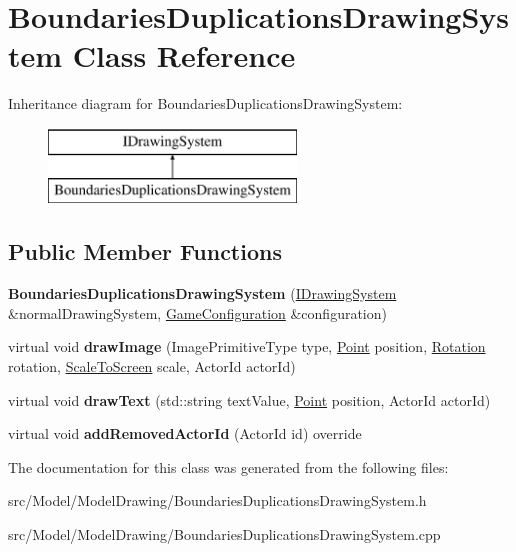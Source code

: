 \hypertarget{classBoundariesDuplicationsDrawingSystem}{}\section{Boundaries\+Duplications\+Drawing\+System Class Reference}
\label{classBoundariesDuplicationsDrawingSystem}
Inheritance diagram for Boundaries\+Duplications\+Drawing\+System\+:\begin{figure}[H]
\begin{center}
\leavevmode
\includegraphics[height=2.000000cm]{classBoundariesDuplicationsDrawingSystem}
\end{center}
\end{figure}
\subsection*{Public Member Functions}
\begin{DoxyCompactItemize}
\item 
{\bfseries Boundaries\+Duplications\+Drawing\+System} (\hyperlink{classIDrawingSystem}{I\+Drawing\+System} \&normal\+Drawing\+System, \hyperlink{classGameConfiguration}{Game\+Configuration} \&configuration)\hypertarget{classBoundariesDuplicationsDrawingSystem_aa7e9dc7d958875a3ff5be36220772b81}{}\label{classBoundariesDuplicationsDrawingSystem_aa7e9dc7d958875a3ff5be36220772b81}

\item 
virtual void {\bfseries draw\+Image} (Image\+Primitive\+Type type, \hyperlink{classPoint}{Point} position, \hyperlink{classRotation}{Rotation} rotation, \hyperlink{classScaleToScreen}{Scale\+To\+Screen} scale, Actor\+Id actor\+Id)\hypertarget{classBoundariesDuplicationsDrawingSystem_aaa9f57dbe6ffca81e36c9f14203cf4f8}{}\label{classBoundariesDuplicationsDrawingSystem_aaa9f57dbe6ffca81e36c9f14203cf4f8}

\item 
virtual void {\bfseries draw\+Text} (std\+::string text\+Value, \hyperlink{classPoint}{Point} position, Actor\+Id actor\+Id)\hypertarget{classBoundariesDuplicationsDrawingSystem_ac9785d4966c65f6c33db11d7f1cc401f}{}\label{classBoundariesDuplicationsDrawingSystem_ac9785d4966c65f6c33db11d7f1cc401f}

\item 
virtual void {\bfseries add\+Removed\+Actor\+Id} (Actor\+Id id) override\hypertarget{classBoundariesDuplicationsDrawingSystem_ad3779a653b21d84b68d190d38176a1cc}{}\label{classBoundariesDuplicationsDrawingSystem_ad3779a653b21d84b68d190d38176a1cc}

\end{DoxyCompactItemize}


The documentation for this class was generated from the following files\+:\begin{DoxyCompactItemize}
\item 
src/\+Model/\+Model\+Drawing/Boundaries\+Duplications\+Drawing\+System.\+h\item 
src/\+Model/\+Model\+Drawing/Boundaries\+Duplications\+Drawing\+System.\+cpp\end{DoxyCompactItemize}
